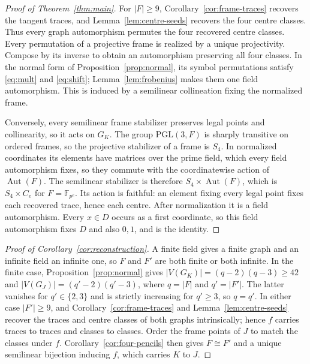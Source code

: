 \documentclass[11pt]{article}
\theoremstyle{definition}
\theoremstyle{remark}
\newcommand{\F}{\mathbb F}
\newcommand{\PGL}{\mathrm{PGL}}
\newcommand{\Aut}{\operatorname{Aut}}
\begin{document}
\begin{proof}[Proof of Theorem~\ref{thm:main}]
For $|F|\ge9$, Corollary~\ref{cor:frame-traces} recovers the tangent traces,
and Lemma~\ref{lem:centre-seeds} recovers the four centre classes.  Thus every graph automorphism
permutes the four recovered centre classes.  Every permutation of a
projective frame is realized by a unique projectivity.  Compose by its
inverse to obtain an automorphism preserving all four classes.  In the
normal form of Proposition~\ref{prop:normal}, its symbol permutations
satisfy \eqref{eq:mult} and \eqref{eq:shift}; Lemma~\ref{lem:frobenius}
makes them one field automorphism.  This is induced by a semilinear
collineation fixing the normalized frame.

Conversely, every semilinear frame stabilizer preserves legal points and
collinearity, so it acts on $G_K$.  The group $\PGL(3,F)$ is sharply
transitive on ordered frames, so the projective stabilizer of a frame is
$S_4$. In normalized coordinates its elements have matrices over the
prime field, which every field automorphism fixes, so they commute with
the coordinatewise action of $\Aut(F)$. The semilinear stabilizer is
therefore $S_4\times\Aut(F)$, which is $S_4\times C_e$ for $F=\F_{p^e}$.
Its action is faithful: an element fixing every legal point fixes each
recovered trace, hence each centre. After normalization it is a field
automorphism. Every $x\in D$ occurs as a first coordinate, so this
field automorphism fixes $D$ and also $0,1$, and is the identity.
\end{proof}

\begin{proof}[Proof of Corollary~\ref{cor:reconstruction}]
A finite field gives a finite graph and an infinite field an infinite
one, so $F$ and $F'$ are both finite or both infinite. In the finite
case, Proposition~\ref{prop:normal} gives $|V(G_K)|=(q-2)(q-3)\ge42$
and $|V(G_J)|=(q'-2)(q'-3)$, where $q=|F|$ and $q'=|F'|$. The latter
vanishes for $q'\in\{2,3\}$ and is strictly increasing for $q'\ge3$, so
$q=q'$. In either case $|F'|\ge9$, and Corollary~\ref{cor:frame-traces}
and Lemma~\ref{lem:centre-seeds} recover the traces and centre classes of
both graphs intrinsically; hence $f$ carries traces to traces and classes
to classes. Order the frame points of $J$ to match the classes under $f$.
Corollary~\ref{cor:four-pencils} then gives $F\cong F'$ and a unique
semilinear bijection inducing $f$, which carries $K$ to $J$.
\end{proof}
\end{document}
